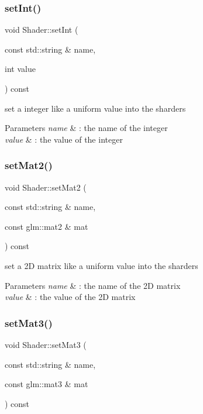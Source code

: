 \subsubsection{\texorpdfstring{set\+Int()}{setInt()}}
{\footnotesize\ttfamily void Shader\+::set\+Int (\begin{DoxyParamCaption}\item[{const std\+::string \&}]{name,  }\item[{int}]{value }\end{DoxyParamCaption}) const}



set a integer like a uniform value into the sharders 


\begin{DoxyParams}{Parameters}
{\em name} & \+: the name of the integer \\
\hline
{\em value} & \+: the value of the integer \\
\hline
\end{DoxyParams}
\mbox{\label{class_shader_a91a6ee79b959cacd618c9e29a5bbd732}} 
\subsubsection{\texorpdfstring{set\+Mat2()}{setMat2()}}
{\footnotesize\ttfamily void Shader\+::set\+Mat2 (\begin{DoxyParamCaption}\item[{const std\+::string \&}]{name,  }\item[{const glm\+::mat2 \&}]{mat }\end{DoxyParamCaption}) const}



set a 2D matrix like a uniform value into the sharders 


\begin{DoxyParams}{Parameters}
{\em name} & \+: the name of the 2D matrix \\
\hline
{\em value} & \+: the value of the 2D matrix \\
\hline
\end{DoxyParams}
\mbox{\label{class_shader_a3e24fcad187493dfebaa12939072e91d}} 
\subsubsection{\texorpdfstring{set\+Mat3()}{setMat3()}}
{\footnotesize\ttfamily void Shader\+::set\+Mat3 (\begin{DoxyParamCaption}\item[{const std\+::string \&}]{name,  }\item[{const glm\+::mat3 \&}]{mat }\end{DoxyParamCaption}) const}




